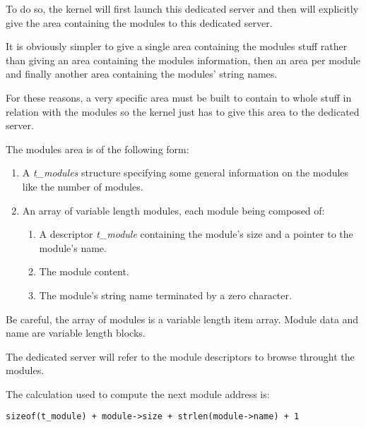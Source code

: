 To do so, the kernel will first launch this dedicated server and then
will explicitly give the area containing the modules to this dedicated
server.

It is obviously simpler to give a single area containing the modules
stuff rather than giving an area containing the modules information, then
an area per module and finally another area containing the modules' string
names.

For these reasons, a very specific area must be built to contain
to whole stuff in relation with the modules so the kernel just has to
give this area to the dedicated server.

The modules area is of the following form:

\begin{enumerate}
  \item
    A \textit{t\_modules} structure specifying some general information on
    the modules like the number of modules.
  \item
    An array of variable length modules, each module being composed of:

    \begin{enumerate}
      \item
	A descriptor \textit{t\_module} containing the module's size and
	a pointer to the module's name.
      \item
	The module content.
      \item
	The module's string name terminated by a zero character.
    \end{enumerate}
\end{enumerate}

Be careful, the array of modules is a variable length item array.
Module data and name are variable length blocks.

The dedicated server will refer to the module descriptors to browse
throught the modules.

The calculation used to compute the next module address is:

\begin{verbatim}
sizeof(t_module) + module->size + strlen(module->name) + 1
\end{verbatim}


%
%

